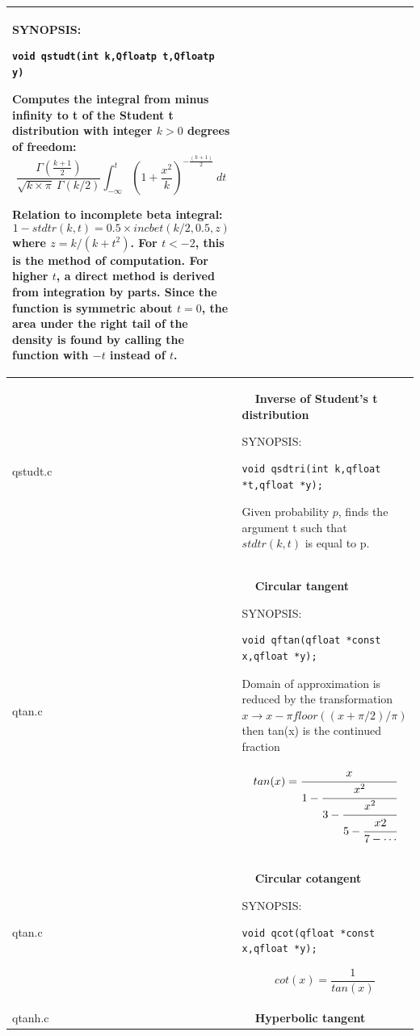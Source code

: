 \documentclass[10pt,a4paper,x11names]{memoir} %
\newcounter{entry}
\newcommand{\TOC}[1] {\addcontentsline{toc}{section}{\theentry\ \  #1} \textbf{\theentry\ \  #1} \par\stepcounter{entry}}
\begin{document}
\begin{longtable}{|p{1.5cm}|p{11.5cm}|}
	{\footnotesize SYNOPSIS:}\vspace{-0.2cm}\index{qstudt}
	\begin{lstlisting}[numbers=none]
		void qstudt(int k,Qfloatp t,Qfloatp y)
	\end{lstlisting}\vspace{-0.2cm}
	
	Computes the integral from minus infinity to t of the Student
	t distribution with integer $k > 0$ degrees of freedom:
	$$\frac{\Gamma (\frac{k+1}{2})}{\sqrt{k \times \pi}\ \Gamma (k/2)}\int_{-\infty}^{t}\left( 1+\frac{x^2}{k}
	\right)^{-\frac{(k+1)}{2}}\ dt$$
	
	Relation to incomplete beta integral:
	$$ 1-stdtr(k,t)=0.5 \times incbet(k/2,0.5,z)$$
	where
	$ z = k/(k + t^2)$.
	For $t < -2$, this is the method of computation.  For higher $t$,
	a direct method is derived from integration by parts.
	Since the function is symmetric about $t=0$, the area under the
	right tail of the density is found by calling the function
	with $-t$ instead of $t$.
	\\\hline
	qstudt.c& \TOC{Inverse of Student's t distribution}
	
	{\footnotesize SYNOPSIS:}\vspace{-0.2cm}\index{qsdtri}
	\begin{lstlisting}[numbers=none]
		void qsdtri(int k,qfloat *t,qfloat *y);
	\end{lstlisting}\vspace{-0.2cm}
	Given probability $p$, finds the argument t such that $stdtr(k,t)$ is equal to p.
	\\\hline
	qtan.c& \TOC{Circular tangent}
	
	{\footnotesize SYNOPSIS:}\vspace{-0.2cm}\index{qftan}
	\begin{lstlisting}[numbers=none]
		void qftan(qfloat *const x,qfloat *y);
	\end{lstlisting}\vspace{-0.2cm}
	Domain of approximation is reduced by the transformation
	$x \rightarrow x - \pi floor((x + \pi/2)/\pi)$
	then tan(x) is the continued fraction
	
	$$tan(x)=\cfrac{x}{1-\cfrac{x^2}{3-\cfrac{x^2}{5-\cfrac{x2}{7-\dotsb}}}}$$
	\\\hline
	qtan.c& \TOC{Circular cotangent}
	
	{\footnotesize SYNOPSIS:}\vspace{-0.2cm}\index{qcot}
	\begin{lstlisting}[numbers=none]
		void qcot(qfloat *const x,qfloat *y);
	\end{lstlisting}\vspace{-0.2cm}
	$$ cot(x)=\frac{1}{tan(x)}$$
	\\\hline
	qtanh.c& \TOC{Hyperbolic tangent}
	

\end{longtable}
\end{document}
